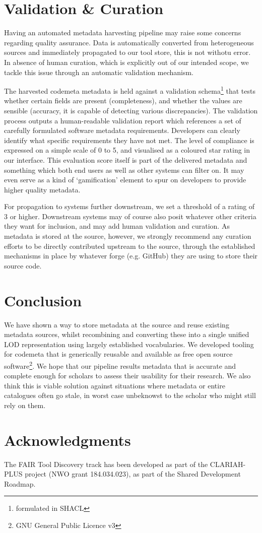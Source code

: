 \documentclass[a4paper,11pt]{article}
\begin{document}
\section{Validation \& Curation}

Having an automated metadata harvesting pipeline may raise some concerns
regarding quality assurance. Data is automatically converted from heterogeneous
sources and immediately propagated to our tool store, this is not withotu
error. In absence of human curation, which is explicitly out of our intended
scope, we tackle this issue through an automatic validation mechanism.

The harvested codemeta metadata is held against a validation
schema\footnote{formulated in SHACL} that tests whether certain fields are
present (completeness), and whether the values are sensible (accuracy, it is
capable of detecting various discrepancies). The validation process outputs a
human-readable validation report which references a set of carefully formulated
software metadata requirements. Developers can clearly identify what
specific requirements they have not met. The level of compliance is expressed on a
simple scale of 0 to 5, and visualised as a coloured star rating in our
interface. This evaluation score itself is part of the delivered metadata and
something which both end users as well as other systems can filter on. It may
even serve as a kind of `gamification' element to spur on developers to provide
higher quality metadata. 

For propagation to systems further downstream, we set a threshold of a rating
of 3 or higher. Downstream systems may of course also posit whatever other
criteria they want for inclusion, and may add human validation and curation. As
metadata is stored at the source, however, we strongly recommend any curation
efforts to be directly contributed upstream to the source, through the
established mechanisms in place by whatever forge (e.g. GitHub) they are using
to store their source code.

\section{Conclusion}

We have shown a way to store metadata at the source and reuse existing metadata
sources, whilst recombining and converting these into a single unified LOD
representation using largely established vocabularies. We developed tooling for
codemeta that is generically reusable and available as free open source
software\footnote{GNU General Public Licence v3}. We hope that our pipeline
results metadata that is accurate and complete enough for scholars to assess
their usability for their research. We also think this is viable solution
against situations where metadata or entire catalogues often go stale, in worst
case unbeknowst to the scholar who might still rely on them.

\section*{Acknowledgments}

The FAIR Tool Discovery track has been developed as part of the CLARIAH-PLUS
project (NWO grant 184.034.023), as part of the Shared Development Roadmap.

\printbibliography
\end{document}
